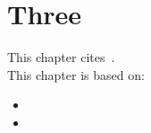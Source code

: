 \chapter{Three}
This chapter cites~\cite{vanhooland_dh_2012,mannens_compsac_2012}.
\\[\baselineskip]

\noindent
This chapter is based on:
\begin{itemize}
  \item {}
  \item {}
\end{itemize}

\printbibliography[heading=subbibliography,notcategory=onlyfullcite]
